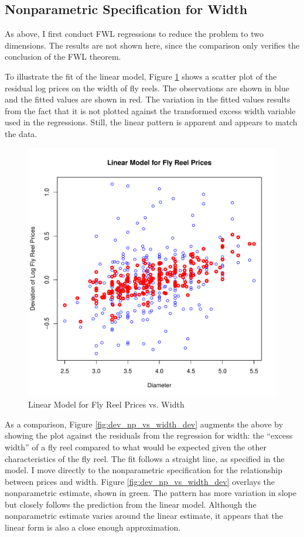 \documentclass[11pt]{paper}
\begin{document}
\subsection{Nonparametric Specification for Width}

As above, I first conduct FWL regressions 
to reduce the problem to two dimensions. 
The results are not shown here, 
since the comparison only verifies 
the conclusion of the FWL theorem. 

To illustrate the fit of the linear model, 
Figure \ref{fig:dev_vs_width} shows a scatter plot 
of the residual log prices on 
the width of fly reels. 
The observations are shown in blue
and the fitted values are shown in red.
The variation in the fitted values results from the 
fact that it is not plotted against the transformed 
excess width variable 
used in the regressions.
Still, the linear pattern is apparent
and appears to match the data. 

\begin{figure}[h!]
  \centering
  \includegraphics[scale = 0.5, keepaspectratio=true]{../Figures/dev_vs_diameter}
  \caption{Linear Model for Fly Reel Prices vs. Width} \label{fig:dev_vs_width}
\end{figure}



\pagebreak
As a comparison, Figure \ref{fig:dev_np_vs_width_dev} 
augments the above by showing the plot against the 
residuals from the regression for 
width:
the ``excess width'' of a fly reel 
compared to what would be 
expected given the other characteristics of the fly reel. 
The fit follows a straight line, as specified in the model. 
% 
I move directly to the nonparametric specification for 
the relationship between prices and 
width.
Figure \ref{fig:dev_np_vs_width_dev} 
overlays the nonparametric estimate, shown in green. 
The pattern has more variation in slope but 
closely follows the prediction from the linear model. 
Although the nonparametric estimate varies around the linear estimate,
it appears that the linear form
is also a close enough approximation.
\end{document}

